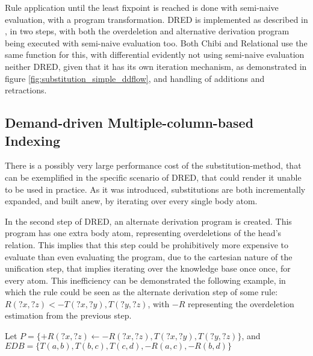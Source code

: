 \documentclass[sigconf,screen,review,natbib]{acmart}
\theoremstyle{definition}
\begin{document}
Rule application until the least fixpoint is reached is done with semi-naive evaluation\cite{abiteboul}, with a program
transformation. DRED is implemented as described in \cite{dred}, in two steps, with both the overdeletion and alternative
derivation program being executed with semi-naive evaluation too. Both Chibi and Relational use the same function for this,
with differential evidently not using semi-naive evaluation neither DRED, given that it has its own iteration mechanism, as
demonstrated in figure \ref{fig:substitution_simple_ddflow}, and handling of additions and retractions.

\subsection{Demand-driven Multiple-column-based Indexing}
There is a possibly very large performance cost of the substitution-method, that can be exemplified in the specific scenario
of DRED, that could render it unable to be used in practice. As it was introduced, substitutions are both incrementally expanded,
and built anew, by iterating over every single body atom.

In the second step of DRED, an alternate derivation program is created. This program has one extra body atom, representing
overdeletions of the head's relation. This implies that this step could be prohibitively more expensive to evaluate than even
evaluating the program, due to the cartesian nature of the unification step, that implies iterating over the knowledge base once
once, for every atom. This inefficiency can be demonstrated the following example, in which the rule could be seen as the
alternate derivation step of some rule: $R(?x, ?z) <- T(?x, ?y), T(?y, ?z)$, with $-R$ representing the overdeletion estimation
from the previous step.

Let $P = \{+R(?x, ?z) \leftarrow -R(?x, ?z), T(?x, ?y), T(?y, ?z)\}$, and $EDB = \{T(a, b), T(b, c), T(c, d), -R(a, c), -R(b, d)\}$
\end{document}
